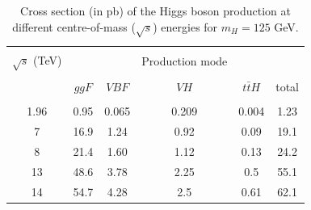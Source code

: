 \begin{table}[ht]
	{\setlength{\tabcolsep}{14pt}
		\caption{Cross section (in pb) of the Higgs boson production at different centre-of-mass ($\sqrt{s}$) energies for $m_H=125$ GeV.}
		\begin{center}
			\vspace{-6mm}
			\begin{tabular}{cccccc}
				\hline \\[-2.45ex] \hline \\[-2.1ex]
				$\sqrt{s}$ (TeV) &&&Production mode&&\\
				\hline \\[-1.8ex]
				& $ggF$ & $VBF$ & $VH$ & $t\bar tH$ & total \\
				\hline \\[-1.8ex]
                1.96 & 0.95 & 0.065 & 0.209 & 0.004 & 1.23 \\
                7 & 16.9 & 1.24 & 0.92 & 0.09 & 19.1 \\
                8 & 21.4 & 1.60 & 1.12 & 0.13 & 24.2 \\
                13 & 48.6 & 3.78 & 2.25 & 0.5 & 55.1 \\
                14 & 54.7 & 4.28 & 2.5 & 0.61 & 62.1 \\
				\hline
			\end{tabular}
			\vspace{-6mm}
		\end{center}
		\label{HiggsxsecTable}}
\end{table}

